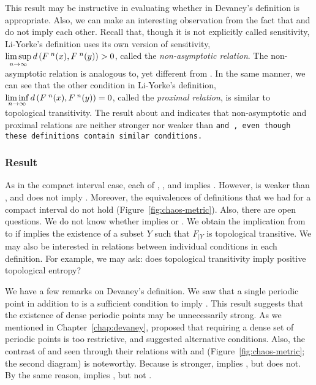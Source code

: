 \documentclass[10pt,twoside,draft]{book}
\begin{document}
This result may be instructive in evaluating whether \dpp in Devaney's definition is appropriate.
Also, we can make an interesting observation from the fact that \wig and \liy do not imply each other. 
Recall that, though it is not explicitly called sensitivity, Li-Yorke's definition uses its own version of sensitivity, $\limsup\limits_{n\to \infty} d\left( F^{\;n}(x), F^{\;n}(y) \right) > 0$, called the \textit{non-asymptotic relation}.
The non-asymptotic relation is analogous to, yet different from \sdic.
In the same manner, we can see that the other condition in Li-Yorke's definition, $\liminf\limits_{n\to \infty} d\left( F^{\;n}(x), F^{\;n}(y) \right) = 0$, called the \textit{proximal relation}, is similar to topological transitivity.
The result about \wig and \liy indicates that non-asymptotic and proximal relations are neither stronger nor weaker than \tt and \sdic, even though these definitions contain similar conditions.

\subsubsection*{Result}
As in the compact interval case, each of \dev, \blcp, and \akm implies \liy.
However, \wig is weaker than \dev, and does not imply \liy.
Moreover, the equivalences of definitions that we had for a compact interval do not hold (Figure~\ref{fig:chaos-metric}).
Also, there are open questions.
We do not know whether \akm implies \blcp or \dev.
We obtain the implication from \akm to \wig if \akm implies the existence of a subset $Y$ such that $F_{|Y}$ is topological transitive.
We may also be interested in relations between individual conditions in each definition.
For example, we may ask: does topological transitivity imply positive topological entropy?

We have a few remarks on Devaney's definition.
We saw that a single periodic point in addition to \wig is a sufficient condition to imply \liy. 
This result suggests that the existence of dense periodic points may be unnecessarily strong.
As we mentioned in Chapter~\ref{chap:devaney}, \citet{glasner} proposed that requiring a dense set of periodic points is too restrictive, and suggested alternative conditions.
Also, the contrast of \dev and \wig seen through their relations with \akm and \liy (Figure~\ref{fig:chaos-metric}; the second diagram) is noteworthy.
Because \dev is stronger, \dev implies \liy, but \wig does not.
By the same reason, \blcp implies \wig, but not \dev.



\end{document}
